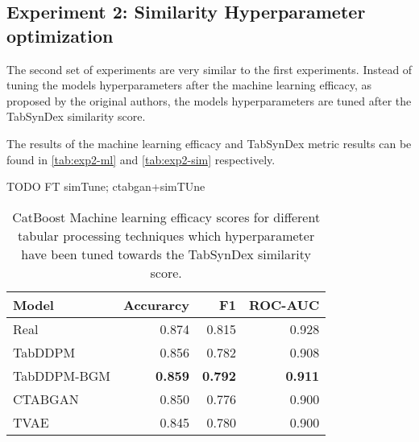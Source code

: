\subsection[]{Experiment 2: Similarity Hyperparameter optimization}
\label{ch:Experiment-2}

The second set of experiments are very similar to the first experiments.
Instead of tuning the models hyperparameters after the machine learning efficacy, as proposed by the original authors,
the models hyperparameters are tuned after the TabSynDex similarity score.

The results of the machine learning efficacy and TabSynDex metric results can be found in \autoref{tab:exp2-ml} and \autoref{tab:exp2-sim} respectively.

TODO FT simTune; ctabgan+simTUne

\begin{table}[h]
	\centering
	\begin{tabular}{lrrr}
		\toprule
		\textbf{Model} & \textbf{Accurarcy} & \textbf{F1}    & \textbf{ROC-AUC} \\
		\midrule
		Real           & 0.874              & 0.815          & 0.928            \\
		TabDDPM        & 0.856              & 0.782          & 0.908            \\
		TabDDPM-BGM    & \textbf{0.859}     & \textbf{0.792} & \textbf{0.911}   \\
		CTABGAN        & 0.850              & 0.776          & 0.900            \\
		TVAE           & 0.845              & 0.780          & 0.900            \\
		\bottomrule
	\end{tabular}
	\caption[Experiment2-ML-Efficacy]{CatBoost Machine learning efficacy scores for different tabular processing techniques which hyperparameter have been tuned towards the TabSynDex similarity score.}
	\label{tab:exp2-ml}
\end{table}


